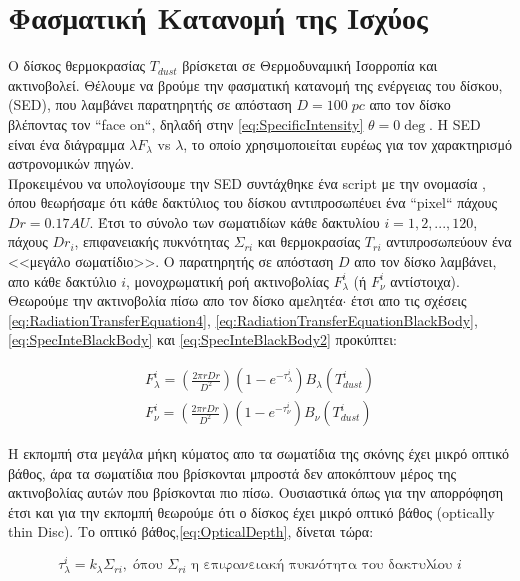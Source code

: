 \section{Φασματική Κατανομή της Ισχύος}

Ο δίσκος θερμοκρασίας $Τ_{dust}$ βρίσκεται σε Θερμοδυναμική Ισορροπία και ακτινοβολεί. Θέλουμε να βρούμε την φασματική κατανομή της ενέργειας του δίσκου, ({\en SED}),  που λαμβάνει παρατηρητής σε απόσταση $D=100 \; pc$ απο τον δίσκο βλέποντας τον {\en ``face on``}, δηλαδή στην \eqref{eq:SpecificIntensity} $\theta=0\deg$. H {\en SED} είναι ένα διάγραμμα $\lambda F_{\lambda}$ {\en vs} $\lambda$, το οποίο χρησιμοποιείται ευρέως για τον χαρακτηρισμό αστρονομικών πηγών.\\
Προκειμένου να υπολογίσουμε την {\en SED} συντάχθηκε ένα {\en script} με την ονομασία {}, όπου θεωρήσαμε ότι κάθε δακτύλιος του δίσκου αντιπροσωπέυει ένα {\en ``pixel``} πάχους $Dr=0.17AU$. Έτσι το σύνολο των σωματιδίων κάθε δακτυλίου $i=1,2,...,120$, πάχους $Dr_i$, επιφανειακής πυκνότητας $\Sigma_{ri}$ και θερμοκρασίας $Τ_{ri}$ αντιπροσωπεύουν ένα <<μεγάλο σωματίδιο>>.  Ο παρατηρητής σε απόσταση $D$ απο τον δίσκο λαμβάνει, απο κάθε δακτύλιο $i$, μονοχρωματική ροή ακτινοβολίας $F_{\lambda}^i$ (ή $F_{\nu}^i$ αντίστοιχα). Θεωρούμε την ακτινοβολία πίσω απο τον δίσκο αμελητέα$\cdot$ έτσι απο τις σχέσεις \eqref{eq:RadiationTransferEquation4}, \eqref{eq:RadiationTransferEquationBlackBody}, \eqref{eq:SpecInteBlackBody} και \eqref{eq:SpecInteBlackBody2} προκύπτει:

\begin{align}
 F_{\lambda}^i = (\frac{2\pi rDr}{D^2})(1-e^{-\tau_{\lambda}^i})B_{\lambda}(Τ_{dust}^i)\label{eq:MonochromaticFlux}\\
 F_{\nu}^i = (\frac{2\pi rDr}{D^2})(1-e^{-\tau_{\nu}^i})B_{\nu}(Τ_{dust}^i)\nonumber
\end{align}

Η εκπομπή στα μεγάλα μήκη κύματος απο τα σωματίδια της σκόνης έχει μικρό οπτικό βάθος, άρα τα σωματίδια που βρίσκονται μπροστά δεν αποκόπτουν μέρος της ακτινοβολίας αυτών που βρίσκονται πιο πίσω. Ουσιαστικά όπως για την απορρόφηση έτσι και για την εκπομπή θεωρούμε ότι ο δίσκος έχει μικρό οπτικό βάθος ({\en optically thin Disc}). Το οπτικό βάθος,\eqref{eq:OpticalDepth}, δίνεται τώρα:

\begin{equation}\label{eq:OpticalDepth2}
  \tau_{\lambda}^i = k_{\lambda} \Sigma_{ri},\; \text{όπου $\Sigma_{ri}$ η επιφανειακή πυκνότητα του δακτυλίου $i$}
\end{equation}

